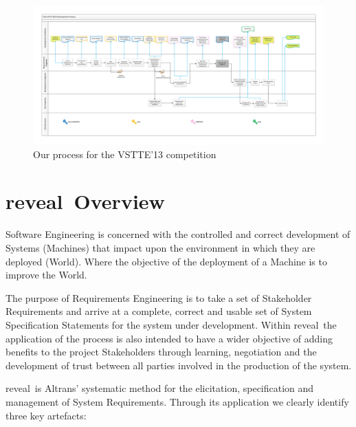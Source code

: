 \documentclass{report}
\newcommand{\reveal}[0]{{\sc reveal}\texttrademark}
\begin{document}
\begin{figure}
  \includegraphics[width=\textwidth]{pictures/SwimLaneProcessDiagram.pdf}
  \caption{Our process for the VSTTE'13 competition}
  \label{fig:the_process}
\end{figure}

\clearpage

\section{\reveal\ Overview}
\label{sec:reveal}
Software Engineering is concerned with the controlled and correct
development of Systems (Machines) that impact upon the environment in
which they are deployed (World). Where the objective of the deployment
of a Machine is to improve the World.

The purpose of Requirements Engineering is to take a set of
Stakeholder Requirements and arrive at a complete, correct and usable
set of System Specification Statements for the system under
development. Within \reveal\ the application of the
process is also intended to have a wider objective of adding benefits
to the project Stakeholders through learning, negotiation and the
development of trust between all parties involved in the production of
the system.

\reveal\ is Altrans' systematic method for the
elicitation, specification and management of System
Requirements. Through its application we clearly identify three key
artefacts:
\end{document}
